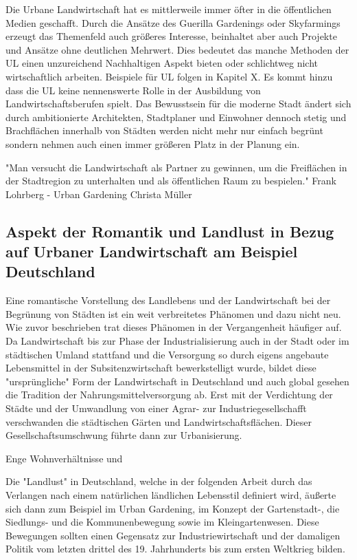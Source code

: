 \documentclass{scrartcl}
\begin{document}
Die Urbane Landwirtschaft hat es mittlerweile immer öfter in die öffentlichen Medien geschafft. Durch die Ansätze des Guerilla Gardenings oder Skyfarmings erzeugt das Themenfeld auch größeres Interesse, beinhaltet aber auch Projekte und Ansätze ohne deutlichen Mehrwert. Dies bedeutet das manche Methoden der UL einen unzureichend Nachhaltigen Aspekt bieten oder schlichtweg nicht wirtschaftlich arbeiten. Beispiele für UL folgen in Kapitel X. Es kommt hinzu dass die UL keine nennenswerte Rolle in der Ausbildung von Landwirtschaftsberufen spielt. Das Bewusstsein für die moderne Stadt ändert sich durch ambitionierte Architekten, Stadtplaner und Einwohner dennoch stetig und Brachflächen innerhalb von Städten werden nicht mehr nur einfach begrünt sondern nehmen auch einen immer größeren Platz in der Planung ein. 

"Man versucht die Landwirtschaft als Partner zu gewinnen, um die Freiflächen in der Stadtregion zu unterhalten und als öffentlichen Raum zu bespielen." Frank Lohrberg - Urban Gardening Christa Müller

\subsection{Aspekt der Romantik und Landlust in Bezug auf Urbaner Landwirtschaft am Beispiel Deutschland}

Eine romantische Vorstellung des Landlebens und der Landwirtschaft bei der Begrünung von Städten ist ein weit verbreitetes Phänomen und dazu nicht neu. Wie zuvor beschrieben trat dieses Phänomen in der Vergangenheit häufiger auf. Da Landwirtschaft bis zur Phase der Industrialisierung auch in der Stadt oder im städtischen Umland stattfand und die Versorgung so durch eigens angebaute Lebensmittel in der Subsitenzwirtschaft bewerkstelligt wurde, bildet diese "ursprüngliche" Form der Landwirtschaft in Deutschland und auch global gesehen die Tradition der Nahrungsmittelversorgung ab. Erst mit der Verdichtung der Städte und der Umwandlung von einer Agrar- zur Industriegesellschafft verschwanden die städtischen Gärten und Landwirtschaftsflächen. Dieser Gesellschaftsumschwung führte dann zur Urbanisierung.

Enge Wohnverhältnisse und 

Die "Landlust" in Deutschland, welche in der folgenden Arbeit durch das Verlangen nach einem natürlichen ländlichen Lebensstil definiert wird, äußerte sich dann zum Beispiel im Urban Gardening, im Konzept der Gartenstadt-, die Siedlungs- und die Kommunenbewegung sowie im Kleingartenwesen. Diese Bewegungen sollten einen Gegensatz zur Industriewirtschaft und der damaligen Politik vom letzten drittel des 19. Jahrhunderts bis zum ersten Weltkrieg bilden.
\end{document}
